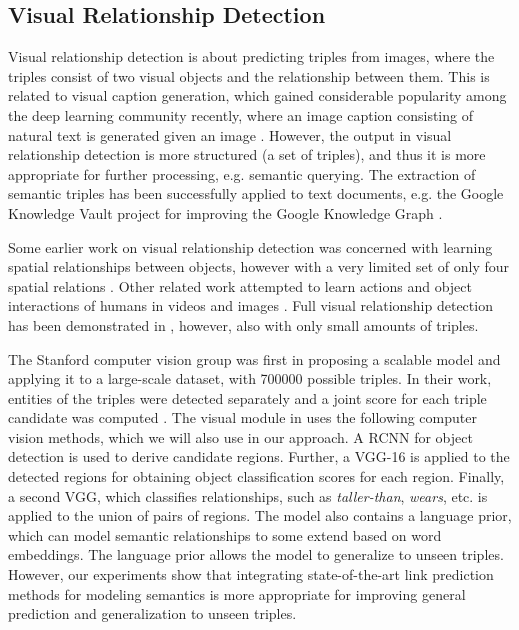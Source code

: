 \documentclass[runningheads,a4paper]{llncs}
\begin{document}
\subsection{Visual Relationship Detection}

Visual relationship detection is about predicting triples from images, where the triples consist of two visual objects and the relationship between them. This is related to visual caption generation, which gained considerable popularity among the deep learning community recently, where an image caption consisting of natural text is generated given an image  \cite{caption1, caption2}. However, the output in visual relationship detection is more structured (a set of triples), and thus it is more appropriate for further processing, e.g. semantic querying. The extraction of semantic triples has been successfully applied to text documents, e.g. the Google Knowledge Vault project for improving the Google Knowledge Graph \cite{knowledge_vault}.

Some earlier work on visual relationship detection was concerned with learning spatial relationships between objects, however with a very limited set of only four spatial relations \cite{spatial1, spatial2}. Other related work attempted to learn actions and object interactions of humans in videos and images \cite{action1,action2,action3,action4,action5}. Full visual relationship detection has been demonstrated in \cite{phrase1, phrase2}, however, also with only small amounts of triples. 

The Stanford computer vision group was first in proposing a scalable model and applying it to a  large-scale dataset, with 700000 possible triples. In their work,  entities of the triples were  detected separately and a joint score for each triple candidate was computed \cite{visual}. The visual module in \cite{visual} uses the following computer vision methods, which we will also use in our approach. A RCNN for object detection is used to derive candidate regions. Further, a VGG-16 is applied to the detected regions for obtaining object classification scores for each region. Finally, a second VGG, which classifies relationships, such as \textit{taller-than}, \textit{wears}, etc. is applied to the union of pairs of regions.  The model also contains a language prior, which can model semantic relationships to some extend based on word embeddings. The language prior allows the model to generalize to unseen triples. However, our experiments show that integrating state-of-the-art link prediction methods for modeling semantics is more appropriate for improving general prediction and generalization to unseen triples.
\end{document}
